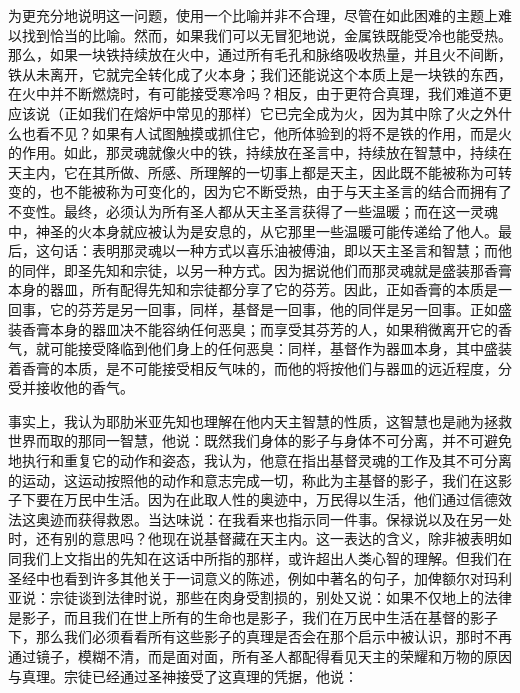 为更充分地说明这一问题，使用一个比喻并非不合理，尽管在如此困难的主题上难以找到恰当的比喻。然而，如果我们可以无冒犯地说，金属铁既能受冷也能受热。那么，如果一块铁持续放在火中，通过所有毛孔和脉络吸收热量，并且火不间断，铁从未离开，它就完全转化成了火本身；我们还能说这个本质上是一块铁的东西，在火中并不断燃烧时，有可能接受寒冷吗？相反，由于更符合真理，我们难道不更应该说（正如我们在熔炉中常见的那样）它已完全成为火，因为其中除了火之外什么也看不见？如果有人试图触摸或抓住它，他所体验到的将不是铁的作用，而是火的作用。如此，那灵魂就像火中的铁，持续放在圣言中，持续放在智慧中，持续在天主内，它在其所做、所感、所理解的一切事上都是天主，因此既不能被称为可转变的，也不能被称为可变化的，因为它不断受热，由于与天主圣言的结合而拥有了不变性。最终，必须认为所有圣人都从天主圣言获得了一些温暖；而在这一灵魂中，神圣的火本身就应被认为是安息的，从它那里一些温暖可能传递给了他人。最后，这句话：表明那灵魂以一种方式以喜乐油被傅油，即以天主圣言和智慧；而他的同伴，即圣先知和宗徒，以另一种方式。因为据说他们而那灵魂就是盛装那香膏本身的器皿，所有配得先知和宗徒都分享了它的芬芳。因此，正如香膏的本质是一回事，它的芬芳是另一回事，同样，基督是一回事，他的同伴是另一回事。正如盛装香膏本身的器皿决不能容纳任何恶臭；而享受其芬芳的人，如果稍微离开它的香气，就可能接受降临到他们身上的任何恶臭：同样，基督作为器皿本身，其中盛装着香膏的本质，是不可能接受相反气味的，而他的将按他们与器皿的远近程度，分受并接收他的香气。\par

事实上，我认为耶肋米亚先知也理解在他内天主智慧的性质，这智慧也是祂为拯救世界而取的那同一智慧，他说：既然我们身体的影子与身体不可分离，并不可避免地执行和重复它的动作和姿态，我认为，他意在指出基督灵魂的工作及其不可分离的运动，这运动按照他的动作和意志完成一切，称此为主基督的影子，我们在这影子下要在万民中生活。因为在此取人性的奥迹中，万民得以生活，他们通过信德效法这奥迹而获得救恩。当达味说：在我看来也指示同一件事。保禄说以及在另一处时，还有别的意思吗？他现在说基督藏在天主内。这一表达的含义，除非被表明如同我们上文指出的先知在这话中所指的那样，或许超出人类心智的理解。但我们在圣经中也看到许多其他关于一词意义的陈述，例如中著名的句子，加俾额尔对玛利亚说：宗徒谈到法律时说，那些在肉身受割损的，别处又说：如果不仅地上的法律是影子，而且我们在世上所有的生命也是影子，我们在万民中生活在基督的影子下，那么我们必须看看所有这些影子的真理是否会在那个启示中被认识，那时不再通过镜子，模糊不清，而是面对面，所有圣人都配得看见天主的荣耀和万物的原因与真理。宗徒已经通过圣神接受了这真理的凭据，他说：\par

